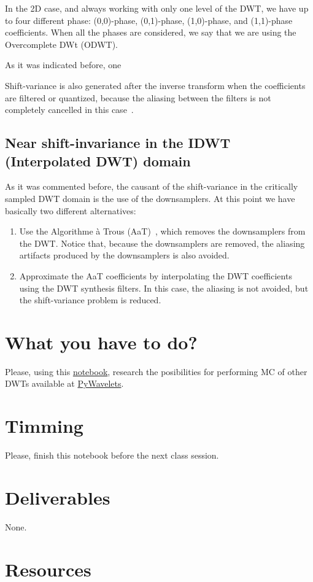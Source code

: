 In the 2D case, and always working with only one level of the DWT, we
have up to four different phase: (0,0)-phase, (0,1)-phase,
(1,0)-phase, and (1,1)-phase coefficients. When all the phases are considered, we say that we are using the Overcomplete DWt (ODWT).

As it was indicated before, one

Shift-variance is also generated after the inverse transform when the
coefficients are filtered or quantized, because the aliasing between
the filters is not completely cancelled in this
case~\cite{bradley2003shift}.

\subsection{Near shift-invariance in the IDWT (Interpolated DWT) domain}
As it was commented before, the causant of the shift-variance in the
critically sampled DWT domain is the use of the downsamplers. At this
point we have basically two different alternatives:
\begin{enumerate}
\item Use the Algorithme \`a Trous (AaT)~\cite{mallat1999wavelet}, which
  removes the downsamplers from the DWT. Notice that, because the
  downsamplers are removed, the aliasing artifacts produced by the
  downsamplers is also avoided.
\item Approximate the AaT coefficients by interpolating the DWT
  coefficients using the DWT synthesis filters. In this case, the
  aliasing is not avoided, but the shift-variance problem is
  reduced.
\end{enumerate}


\section{What you have to do?}
  
Please, using this
\href{https://github.com/Sistemas-Multimedia/Sistemas-Multimedia.github.io/blob/master/study_guide/10-MC_in_DWT_domain/DWT_shift_variance.ipynb}{notebook},
research the posibilities for performing MC of other DWTs available at
\href{https://pywavelets.readthedocs.io/en/latest/}{PyWavelets}.

\section{Timming}

Please, finish this notebook before the next class session.

\section{Deliverables}

None.

\section{Resources}


